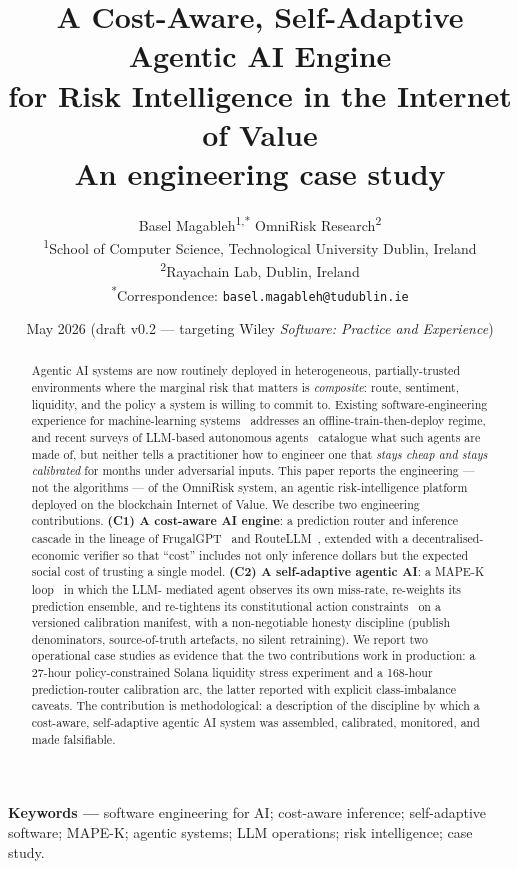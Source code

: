\documentclass[11pt,a4paper]{article}
\title{A Cost-Aware, Self-Adaptive Agentic AI Engine\\
       for Risk Intelligence in the Internet of Value\\[0.2em]
       \large An engineering case study}
\author{%
  Basel Magableh\textsuperscript{1,*} \quad\quad OmniRisk Research\textsuperscript{2} \\[0.8em]
  \normalsize\textsuperscript{1}School of Computer Science, Technological University Dublin, Ireland \\
  \normalsize\textsuperscript{2}Rayachain Lab, Dublin, Ireland \\[0.4em]
  \normalsize\textsuperscript{*}Correspondence: \texttt{basel.magableh@tudublin.ie}
}
\date{May 2026 \quad (draft v0.2 --- targeting Wiley \emph{Software: Practice and Experience})}
\begin{document}
\maketitle

\begin{abstract}
Agentic AI systems are now routinely deployed in heterogeneous,
partially-trusted environments where the marginal risk that matters is
\emph{composite}: route, sentiment, liquidity, and the policy a system
is willing to commit to. Existing software-engineering experience for
machine-learning systems~\cite{sculley2015hidden,amershi2019software}
addresses an offline-train-then-deploy regime, and recent surveys of
LLM-based autonomous agents~\cite{wang2024survey} catalogue what such
agents are made of, but neither tells a practitioner how to engineer one
that \emph{stays cheap and stays calibrated} for months under adversarial
inputs. This paper reports the engineering --- not the algorithms --- of
the OmniRisk system, an agentic risk-intelligence platform deployed on
the blockchain Internet of Value. We describe two engineering
contributions.
\textbf{(C1) A cost-aware AI engine}: a prediction router and inference
cascade in the lineage of FrugalGPT~\cite{chen2023frugalgpt} and
RouteLLM~\cite{ong2024routellm}, extended with a decentralised-economic
verifier so that ``cost'' includes not only inference dollars but the
expected social cost of trusting a single model.
\textbf{(C2) A self-adaptive agentic AI}: a MAPE-K
loop~\cite{salehie2009self,weyns2020introduction} in which the LLM-
mediated agent observes its own miss-rate, re-weights its prediction
ensemble, and re-tightens its constitutional action
constraints~\cite{bai2022constitutional} on a versioned calibration
manifest, with a non-negotiable honesty discipline (publish denominators,
source-of-truth artefacts, no silent retraining).
We report two operational case studies as evidence that the two
contributions work in production: a 27-hour policy-constrained Solana
liquidity stress experiment and a 168-hour prediction-router calibration
arc, the latter reported with explicit class-imbalance caveats. The
contribution is methodological: a description of the discipline by which
a cost-aware, self-adaptive agentic AI system was assembled, calibrated,
monitored, and made falsifiable.
\end{abstract}

\medskip
\noindent\textbf{Keywords ---} software engineering for AI; cost-aware
inference; self-adaptive software; MAPE-K; agentic systems; LLM
operations; risk intelligence; case study.
\end{document}
